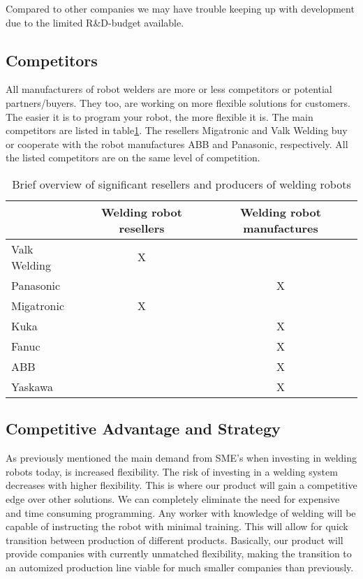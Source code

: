 Compared to other companies we may have trouble keeping up with development due to the limited R\&D-budget available.
\subsection{Competitors}
\label{competitors}
All manufacturers of robot welders are more or less competitors or potential partners/buyers. They too, are working on more flexible solutions for customers. The easier it is to program your robot, the more flexible it is. The main competitors are listed in table\ref{Tablecompetitors}. The resellers Migatronic and Valk Welding buy or cooperate with the robot manufactures ABB and Panasonic, respectively. All the listed competitors are on the same level of competition.

\begin{table}[h]
\centering
\begin{tabular}{|l|c|c|}
\hline
             & Welding robot resellers & Welding robot manufactures \\ 
\hline
Valk Welding & X                       &  \\ 
\hline
Panasonic    &                         & X \\ 
\hline
Migatronic   & X                       &  \\ 
\hline
Kuka         &                         & X \\ 
\hline                                 
Fanuc        &                         & X \\ 
\hline                                 
ABB          &                         & X \\ 
\hline                                 
Yaskawa      &                         & X \\ 
\hline
\end{tabular} 
\caption{Brief overview of significant resellers and producers of welding robots}
\label{Tablecompetitors}
\end{table}

\subsection{Competitive Advantage and Strategy}
As previously mentioned the main demand from SME's when investing in welding robots today, is increased flexibility.
 The risk of investing in a welding system decreases with higher flexibility. This is where our product will gain a competitive edge over other solutions. We can completely eliminate the need for expensive and time consuming programming. Any worker with knowledge of welding will be capable of instructing the robot with minimal training. This will allow for quick transition between production of different products. Basically, our product will provide companies with currently unmatched flexibility, making the transition to an automized production line viable for much smaller companies than previously.